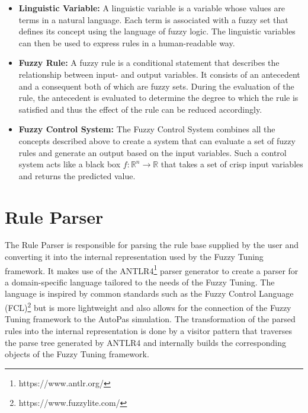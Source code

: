 \begin{itemize}

    \item \textbf{Linguistic Variable:} A linguistic variable is a variable whose values are terms in a natural language. Each term is associated with a fuzzy set that defines its concept using the language of fuzzy logic. The linguistic variables can then be used to express rules in a human-readable way.

    \item \textbf{Fuzzy Rule:} A fuzzy rule is a conditional statement that describes the relationship between input- and output variables. It consists of an antecedent and a consequent both of which are fuzzy sets. During the evaluation of the rule, the antecedent is evaluated to determine the degree to which the rule is satisfied and thus the effect of the rule can be reduced accordingly.

    \item \textbf{Fuzzy Control System:} The Fuzzy Control System combines all the concepts described above to create a system that can evaluate a set of fuzzy rules and generate an output based on the input variables. Such a control system acts like a black box $f: \mathbb{R}^n \rightarrow \mathbb{R}$ that takes a set of crisp input variables and returns the predicted value.
\end{itemize}






\section{Rule Parser}

The Rule Parser is responsible for parsing the rule base supplied by the user and converting it into the internal representation used by the Fuzzy Tuning framework. It makes use of the ANTLR4\footnote{https://www.antlr.org/} parser generator to create a parser for a domain-specific language tailored to the needs of the Fuzzy Tuning. The language is inspired by common standards such as the Fuzzy Control Language (FCL)\footnote{https://www.fuzzylite.com/} but is more lightweight and also allows for the connection of the Fuzzy Tuning framework to the AutoPas simulation. The transformation of the parsed rules into the internal representation is done by a visitor pattern that traverses the parse tree generated by ANTLR4 and internally builds the corresponding objects of the Fuzzy Tuning framework.

